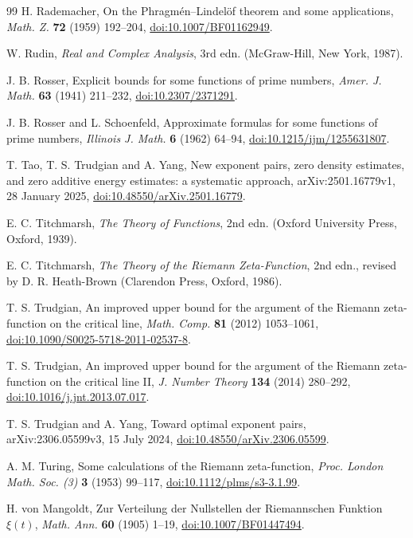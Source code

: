 \documentclass[11pt,reqno]{amsart}
\numberwithin{equation}{section}
\theoremstyle{definition}
\theoremstyle{remark}
\begin{document}
\begin{thebibliography}{99}
 H. Rademacher, On the Phragm\'en--Lindel\"of theorem and some applications, \textit{Math. Z.} \textbf{72} (1959) 192--204, \href{https://doi.org/10.1007/BF01162949}{doi:10.1007/BF01162949}.

 W. Rudin, \textit{Real and Complex Analysis}, 3rd edn. (McGraw-Hill, New York, 1987).

 J. B. Rosser, Explicit bounds for some functions of prime numbers, \textit{Amer. J. Math.} \textbf{63} (1941) 211--232, \href{https://doi.org/10.2307/2371291}{doi:10.2307/2371291}.

 J. B. Rosser and L. Schoenfeld, Approximate formulas for some functions of prime numbers, \textit{Illinois J. Math.} \textbf{6} (1962) 64--94, \href{https://doi.org/10.1215/ijm/1255631807}{doi:10.1215/ijm/1255631807}.

 T. Tao, T. S. Trudgian and A. Yang, New exponent pairs, zero density estimates, and zero additive energy estimates: a systematic approach, arXiv:2501.16779v1, 28 January 2025, \href{https://doi.org/10.48550/arXiv.2501.16779}{doi:10.48550/arXiv.2501.16779}.

 E. C. Titchmarsh, \textit{The Theory of Functions}, 2nd edn. (Oxford University Press, Oxford, 1939).

 E. C. Titchmarsh, \textit{The Theory of the Riemann Zeta-Function}, 2nd edn., revised by D. R. Heath-Brown (Clarendon Press, Oxford, 1986).

 T. S. Trudgian, An improved upper bound for the argument of the Riemann zeta-function on the critical line, \textit{Math. Comp.} \textbf{81} (2012) 1053--1061, \href{https://doi.org/10.1090/S0025-5718-2011-02537-8}{doi:10.1090/S0025-5718-2011-02537-8}.

 T. S. Trudgian, An improved upper bound for the argument of the Riemann zeta-function on the critical line II, \textit{J. Number Theory} \textbf{134} (2014) 280--292, \href{https://doi.org/10.1016/j.jnt.2013.07.017}{doi:10.1016/j.jnt.2013.07.017}.

 T. S. Trudgian and A. Yang, Toward optimal exponent pairs, arXiv:2306.05599v3, 15 July 2024, \href{https://doi.org/10.48550/arXiv.2306.05599}{doi:10.48550/arXiv.2306.05599}.

 A. M. Turing, Some calculations of the Riemann zeta-function, \textit{Proc. London Math. Soc. (3)} \textbf{3} (1953) 99--117, \href{https://doi.org/10.1112/plms/s3-3.1.99}{doi:10.1112/plms/s3-3.1.99}.

 H. von Mangoldt, Zur Verteilung der Nullstellen der Riemannschen Funktion $\xi(t)$, \textit{Math. Ann.} \textbf{60} (1905) 1--19, \href{https://doi.org/10.1007/BF01447494}{doi:10.1007/BF01447494}.

\end{thebibliography}
\end{document}
